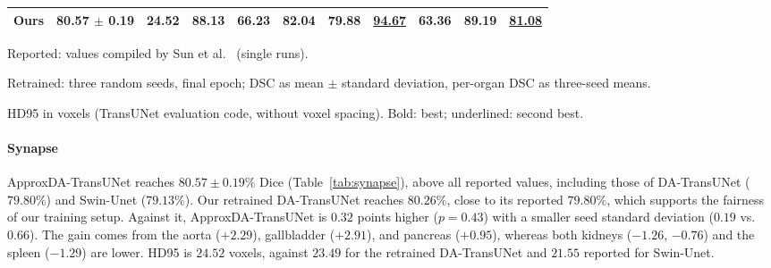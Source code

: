 \begin{table}[t]
{\begin{tabular}{lcccccccccc}
\textbf{Ours} & \textbf{80.57 $\pm$ 0.19} & 24.52 & 88.13 & 66.23 & 82.04 & 79.88 & \underline{94.67} & \textbf{63.36} & 89.19 & \underline{81.08} \\
\bottomrule
\end{tabular}
}
\begin{tablenotes}
\item Reported: values compiled by Sun et al.~\cite{sun2024datransunet} (single runs).
\item Retrained: three random seeds, final epoch; DSC as mean $\pm$ standard deviation, per-organ DSC as three-seed means.
\item HD95 in voxels (TransUNet evaluation code, without voxel spacing). Bold: best; underlined: second best.
\end{tablenotes}
\end{table}

\paragraph{Synapse} ApproxDA-TransUNet reaches $80.57 \pm 0.19\%$ Dice (Table~\ref{tab:synapse}), above all reported values, including those of DA-TransUNet ($79.80\%$) and Swin-Unet ($79.13\%$). Our retrained DA-TransUNet reaches $80.26\%$, close to its reported $79.80\%$, which supports the fairness of our training setup. Against it, ApproxDA-TransUNet is $0.32$ points higher ($p = 0.43$) with a smaller seed standard deviation ($0.19$ vs.\ $0.66$). The gain comes from the aorta ($+2.29$), gallbladder ($+2.91$), and pancreas ($+0.95$), whereas both kidneys ($-1.26$, $-0.76$) and the spleen ($-1.29$) are lower. HD95 is $24.52$ voxels, against $23.49$ for the retrained DA-TransUNet and $21.55$ reported for Swin-Unet.

